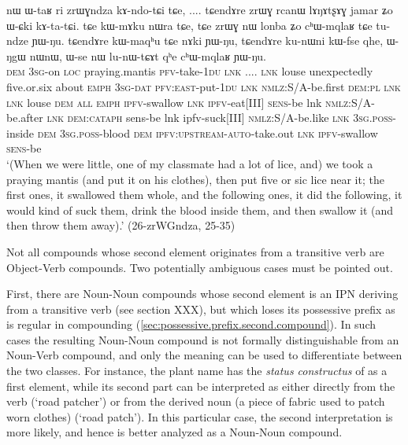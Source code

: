 \begin{exe}
\ex \label{ex:zrWGndza}
\gll nɯ ɯ-taʁ ri zrɯɣndza kɤ-ndo-tɕi tɕe, .... tɕendɤre zrɯɣ rcanɯ lɤŋɤtʂɤɣ jamar ʑo ɯ-ɕki kɤ-ta-tɕi. tɕe kɯ-mɤku nɯra tɕe, tɕe zrɯɣ nɯ lonba ʑo cʰɯ-mqlaʁ tɕe tu-ndze ɲɯ-ŋu. tɕendɤre kɯ-maqʰu tɕe nɤki ɲɯ-ŋu,  tɕendɤre ku-nɯni kɯ-fse qhe, ɯ-ŋgɯ nɯnɯ,  ɯ-se nɯ lu-nɯ-tɕɤt qʰe cʰɯ-mqlaʁ ɲɯ-ŋu. \\
\textsc{dem} \textsc{3sg}-on \textsc{loc} praying.mantis \textsc{pfv}-take-\textsc{1du} \textsc{lnk} .... \textsc{lnk} louse unexpectedly five.or.six about \textsc{emph} \textsc{3sg}-\textsc{dat} \textsc{pfv}:\textsc{east}-put-\textsc{1du} \textsc{lnk} \textsc{nmlz}:S/A-be.first \textsc{dem:pl} \textsc{lnk} \textsc{lnk} louse \textsc{dem} \textsc{all} \textsc{emph} \textsc{ipfv}-swallow \textsc{lnk} \textsc{ipfv}-eat[III] \textsc{sens}-be lnk \textsc{nmlz}:S/A-be.after \textsc{lnk} \textsc{dem}:\textsc{cataph} sens-be lnk ipfv-suck[III] \textsc{nmlz}:S/A-be.like \textsc{lnk} \textsc{3sg.poss}-inside \textsc{dem} \textsc{3sg.poss}-blood \textsc{dem} \textsc{ipfv}:\textsc{upstream}-\textsc{auto}-take.out \textsc{lnk}  \textsc{ipfv}-swallow \textsc{sens}-be \\
\glt `(When we were little, one of my classmate had a lot of lice, and) we took a praying mantis (and put it on his clothes), then put five or sic lice near it; the first ones, it swallowed them whole, and the following ones,  it did the following, it would kind of suck them, drink the blood inside them, and then swallow it (and then throw them away).' (26-zrWGndza, 25-35)
\end{exe}

Not all compounds whose second element originates from a transitive verb are Object-Verb compounds. Two potentially ambiguous cases must be pointed out. 

First, there are Noun-Noun compounds whose second element is an IPN deriving from a transitive verb (see section XXX), but which loses its possessive prefix as is regular in compounding (\ref{sec:possessive.prefix.second.compound}). In such cases the resulting Noun-Noun compound is not formally distinguishable from an Noun-Verb compound, and only the meaning can be used to differentiate between the two classes. For instance, the plant name  has the \textit{status constructus} of  as a first element, while its second part  can be interpreted as either directly from the verb  (`road patcher') or from the derived noun  (a piece of fabric used to patch worn clothes) (`road patch'). In this particular case, the second interpretation is more likely, and hence  is better analyzed as a Noun-Noun compound.

